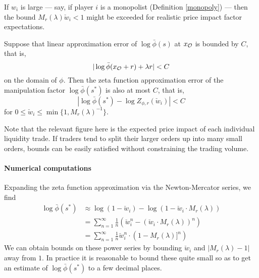 \begin{remark}
  
  If $w_i$ is large --- say, if player $i$ is a monopolist (Definition \ref{monopoly}) --- then the bound $M_r(\lambda)\check w_i < 1$ might be exceeded for realistic price impact factor expectations.

\end{remark}

\begin{theorem} \label{theorem-zeta}

  Suppose that linear approximation error of $\log\bar\phi(s)$ at $x_{\mathcal{O}}$ is bounded by $C$, that is, 
  \[
    |\log\bar\phi(x_{\mathcal{O}} + r) + \lambda r | < C
  \]
  on the domain of $\phi$.
  Then the zeta function approximation error of the manipulation factor $\log\bar\phi({s^*})$ is also at most $C$, that is,
  \[
    | \log\bar\phi({s^*}) - \log Z_{\phi,r}(\check w_i)| < C
  \]
  for $0\leq \check w_i\leq \min\{1,M_r(\lambda)^{-1}\}$.
  

\end{theorem}

\begin{remark}[Sizing $r$]
  Note that the relevant figure here is the expected price impact of each individual liquidity trade.
  If traders tend to split their larger orders up into many small orders, bounds can be easily satisfied without constraining the trading volume.
\end{remark}

\paragraph{Numerical computations} Expanding the zeta function approximation via the Newton-Mercator series, we find
\begin{align}
  \log\bar\phi({s^*}) &\approx \log(1-\check w_i) - \log ( 1-\check w_i\cdot M_r(\lambda) ) \\
  &= \sum_{n=1}^\infty \frac{1}{n}\left(\check w_i^n - (\check w_i\cdot M_r(\lambda) )^n \right) \\
  &= \sum_{n=1}^\infty \frac{1}{n}\check w_i^n\cdot \left(1  - M_r(\lambda)]^n \right)
\end{align}
We can obtain bounds on these power series by bounding $\check w_i$ and $\left|M_r(\lambda)-1\right|$ away from $1$.
%
In practice it is reasonable to bound these quite small so as to get an estimate of $\log\bar\phi({s^*})$ to a few decimal places.

